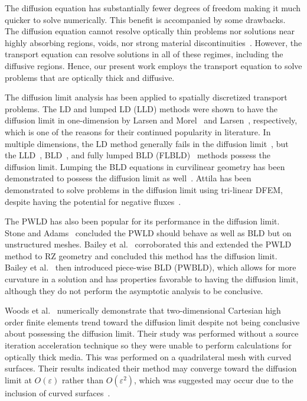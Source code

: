 \documentclass{article}
\begin{document}
The diffusion equation has substantially fewer degrees of freedom making it much quicker to solve numerically. This benefit is accompanied by some drawbacks. The diffusion equation cannot resolve optically thin problems nor solutions near highly absorbing regions, voids, nor strong material discontinuities~\cite{D&H}. However, the transport equation can resolve solutions in all of these regimes, including the diffusive regions. Hence, our present work employs the transport equation to solve problems that are optically thick and diffusive.

The diffusion limit analysis has been applied to spatially discretized transport problems. The LD and lumped LD (LLD) methods were shown to have the diffusion limit in one-dimension by Larsen and Morel~\cite{LarsenAsymptotic} and Larsen~\cite{LarsenAsymptoticDiffusionLimit}, respectively, which is one of the reasons for their continued popularity in literature. In multiple dimensions, the LD method generally fails in the diffusion limit~\cite{BorgersAsymptoticDiffLimit}, but the LLD~\cite{MorelLLDrz, MorelLLDTetrahedral}, BLD~\cite{Adams_Disc_FEM_Thick_Diff}, and fully lumped BLD (FLBLD)~\cite{AdamsDFEMDiffLimit} methods possess the diffusion limit. Lumping the BLD equations in curvilinear geometry has been demonstrated to possess the diffusion limit as well~\cite{PalmerCurvilinearTransport, MorelLBLD}. Attila has been demonstrated to solve problems in the diffusion limit using tri-linear DFEM, despite having the potential for negative fluxes~\cite{AttilaUsersManual}.

The PWLD has also been popular for its performance in the diffusion limit. Stone and Adams~\cite{StonePLFEM} concluded the PWLD should behave as well as BLD but on unstructured meshes. Bailey et al.~\cite{BaileyDFEMCylindrical, BaileyDissertation} corroborated this and extended the PWLD method to RZ geometry and concluded this method has the diffusion limit. Bailey et al.~\cite{BaileyBLDFEM} then introduced piece-wise BLD (PWBLD), which allows for more curvature in a solution and has properties favorable to having the diffusion limit, although they do not perform the asymptotic analysis to be conclusive.

Woods et al.~\cite{WoodsHoDgfemXyCurved} numerically demonstrate that two-dimensional Cartesian high order finite elements trend toward the diffusion limit despite not being conclusive about possessing the diffusion limit. Their study was performed without a source iteration acceleration technique so they were unable to perform calculations for optically thick media. This was performed on a quadrilateral mesh with curved surfaces. Their results indicated their method may converge toward the diffusion limit at $O(\varepsilon)$ rather than $O(\varepsilon^2)$, which was suggested may occur due to the inclusion of curved surfaces~\cite{Adams_Disc_FEM_Thick_Diff}.
\end{document}
